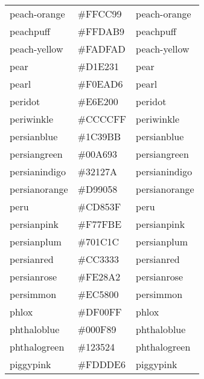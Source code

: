 \documentclass[
]{article}
\begin{document}
\begin{longtable}[]{@{}lll@{}}
peach-orange & \colorbox[rgb]{1.0,0.8,0.6}{\#FFCC99} &
\textcolor[rgb]{1.0,0.8,0.6}{peach-orange          }\tabularnewline
peachpuff & \colorbox[rgb]{1.0,0.85,0.73}{\#FFDAB9} &
\textcolor[rgb]{1.0,0.85,0.73}{peachpuff             }\tabularnewline
peach-yellow & \colorbox[rgb]{0.98,0.87,0.68}{\#FADFAD} &
\textcolor[rgb]{0.98,0.87,0.68}{peach-yellow          }\tabularnewline
pear & \colorbox[rgb]{0.82,0.89,0.19}{\#D1E231} &
\textcolor[rgb]{0.82,0.89,0.19}{pear                  }\tabularnewline
pearl & \colorbox[rgb]{0.94,0.92,0.84}{\#F0EAD6} &
\textcolor[rgb]{0.94,0.92,0.84}{pearl                 }\tabularnewline
peridot & \colorbox[rgb]{0.9,0.89,0.0}{\#E6E200} &
\textcolor[rgb]{0.9,0.89,0.0}{peridot               }\tabularnewline
periwinkle & \colorbox[rgb]{0.8,0.8,1.0}{\#CCCCFF} &
\textcolor[rgb]{0.8,0.8,1.0}{periwinkle            }\tabularnewline
persianblue & \colorbox[rgb]{0.11,0.22,0.73}{\#1C39BB} &
\textcolor[rgb]{0.11,0.22,0.73}{persianblue           }\tabularnewline
persiangreen & \colorbox[rgb]{0.0,0.65,0.58}{\#00A693} &
\textcolor[rgb]{0.0,0.65,0.58}{persiangreen          }\tabularnewline
persianindigo & \colorbox[rgb]{0.2,0.07,0.48}{\#32127A} &
\textcolor[rgb]{0.2,0.07,0.48}{persianindigo         }\tabularnewline
persianorange & \colorbox[rgb]{0.85,0.56,0.35}{\#D99058} &
\textcolor[rgb]{0.85,0.56,0.35}{persianorange         }\tabularnewline
peru & \colorbox[rgb]{0.8,0.52,0.25}{\#CD853F} &
\textcolor[rgb]{0.8,0.52,0.25}{peru                  }\tabularnewline
persianpink & \colorbox[rgb]{0.97,0.5,0.75}{\#F77FBE} &
\textcolor[rgb]{0.97,0.5,0.75}{persianpink           }\tabularnewline
persianplum & \colorbox[rgb]{0.44,0.11,0.11}{\#701C1C} &
\textcolor[rgb]{0.44,0.11,0.11}{persianplum           }\tabularnewline
persianred & \colorbox[rgb]{0.8,0.2,0.2}{\#CC3333} &
\textcolor[rgb]{0.8,0.2,0.2}{persianred            }\tabularnewline
persianrose & \colorbox[rgb]{1.0,0.16,0.64}{\#FE28A2} &
\textcolor[rgb]{1.0,0.16,0.64}{persianrose           }\tabularnewline
persimmon & \colorbox[rgb]{0.93,0.35,0.0}{\#EC5800} &
\textcolor[rgb]{0.93,0.35,0.0}{persimmon             }\tabularnewline
phlox & \colorbox[rgb]{0.87,0.0,1.0}{\#DF00FF} &
\textcolor[rgb]{0.87,0.0,1.0}{phlox                 }\tabularnewline
phthaloblue & \colorbox[rgb]{0.0,0.06,0.54}{\#000F89} &
\textcolor[rgb]{0.0,0.06,0.54}{phthaloblue           }\tabularnewline
phthalogreen & \colorbox[rgb]{0.07,0.21,0.14}{\#123524} &
\textcolor[rgb]{0.07,0.21,0.14}{phthalogreen          }\tabularnewline
piggypink & \colorbox[rgb]{0.99,0.87,0.9}{\#FDDDE6} &
\textcolor[rgb]{0.99,0.87,0.9}{piggypink             }\tabularnewline

\end{longtable}
\end{document}

